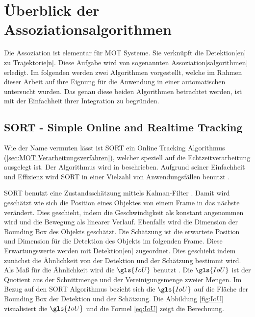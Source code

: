\section{Überblick der Assoziationsalgorithmen}

Die \gls{Assoziation} ist elementar für \gls{MOT} Systeme. Sie verknüpft die \gls{Detektion}[en] zu \gls{Trajektorie}[n]. Diese Aufgabe wird von sogenannten \gls{Assoziation}[salgorithmen] erledigt. Im folgenden werden zwei Algorithmen vorgestellt, welche im Rahmen dieser Arbeit auf ihre Eignung für die Anwendung in einer automatischen  untersucht wurden. Das genau diese beiden Algorithmen betrachtet werden, ist mit der Einfachheit ihrer Integration zu begründen. 


\subsection{SORT - Simple Online and Realtime Tracking}
Wie der Name vermuten lässt ist \acrshort{SORT} ein \gls{Online Tracking} Algorithmus (\ref{sec:MOT Verarbeitungsverfahren}), welcher speziell auf die Echtzeitverarbeitung ausgelegt ist. Der Algorithmus wird in \cite{Bewley.2016} beschrieben. Aufgrund seiner Einfachheit und Effizienz wird \acrshort{SORT} in einer Vielzahl von Anwendungsfällen benutzt \cite{Chen.2023}. \par
{}

\acrshort{SORT} benutzt eine Zustandsschätzung mittels Kalman-Filter \cite{Kalman.1960}. Damit wird geschätzt wie sich die Position eines Objektes von einem \gls{Frame} in das nächste verändert. Dies geschieht, indem die Geschwindigkeit als konstant angenommen wird und die Bewegung als linearer Verlauf. Ebenfalls wird die Dimension der \gls{Bounding Box} des Objekts geschätzt. Die Schätzung ist die erwartete Position und Dimension für die \gls{Detektion} des Objekts im folgenden \gls{Frame}. Diese Erwartungswerte werden mit \gls{Detektion}[en] zugeordnet. Dies geschieht indem zunächst die Ähnlichkeit von der \gls{Detektion} und der Schätzung bestimmt wird. Als Maß für die Ähnlichkeit wird die \(\gls{IoU}\) benutzt  \cite{Bewley.2016}. Die \(\gls{IoU}\) ist der Quotient aus der Schnittmenge und der Vereinigungsmenge zweier Mengen. Im Bezug auf den \acrshort{SORT} Algorithmus bezieht sich die \(\gls{IoU}\) auf die Fläche der \gls{Bounding Box} der \gls{Detektion} und der Schätzung. Die Abbildung \ref{fig:IoU} visualisiert die \(\gls{IoU}\) und die Formel \ref{eq:IoU} zeigt die Berechnung. 

